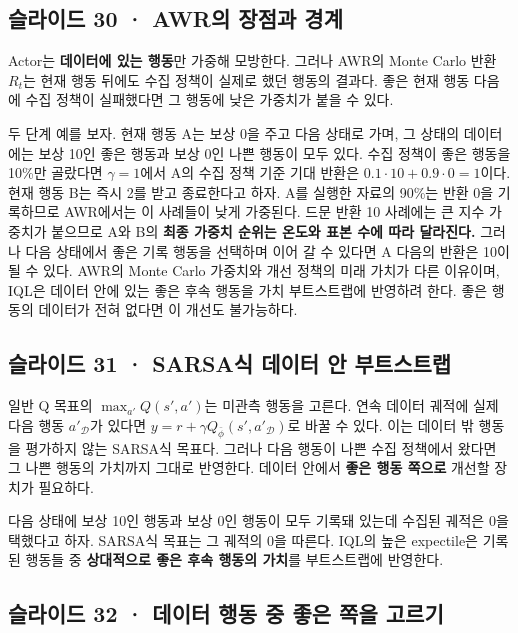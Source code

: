 \documentclass[11pt,a4paper]{article}
\begin{document}
\subsection{슬라이드 30 · AWR의 장점과 경계}

Actor는 \textbf{데이터에 있는 행동}만 가중해 모방한다. 그러나 AWR의 Monte Carlo 반환 $R_t$는 현재 행동 뒤에도 수집 정책이 실제로 했던 행동의 결과다. 좋은 현재 행동 다음에 수집 정책이 실패했다면 그 행동에 낮은 가중치가 붙을 수 있다.\par

두 단계 예를 보자. 현재 행동 A는 보상 0을 주고 다음 상태로 가며, 그 상태의 데이터에는 보상 10인 좋은 행동과 보상 0인 나쁜 행동이 모두 있다. 수집 정책이 좋은 행동을 10\%만 골랐다면 $\gamma=1$에서 A의 수집 정책 기준 기대 반환은 $0.1\cdot10+0.9\cdot0=1$이다. 현재 행동 B는 즉시 2를 받고 종료한다고 하자. A를 실행한 자료의 90\%는 반환 0을 기록하므로 AWR에서는 이 사례들이 낮게 가중된다. 드문 반환 10 사례에는 큰 지수 가중치가 붙으므로 A와 B의 \textbf{최종 가중치 순위는 온도와 표본 수에 따라 달라진다.} 그러나 다음 상태에서 좋은 기록 행동을 선택하며 이어 갈 수 있다면 A 다음의 반환은 10이 될 수 있다. AWR의 Monte Carlo 가중치와 개선 정책의 미래 가치가 다른 이유이며, IQL은 데이터 안에 있는 좋은 후속 행동을 가치 부트스트랩에 반영하려 한다. 좋은 행동의 데이터가 전혀 없다면 이 개선도 불가능하다.\par

\subsection{슬라이드 31 · SARSA식 데이터 안 부트스트랩}

일반 Q 목표의 $\max_{a'}Q(s',a')$는 미관측 행동을 고른다. 연속 데이터 궤적에 실제 다음 행동 $a'_{\mathcal D}$가 있다면 $y=r+\gamma Q_{\bar\phi}(s',a'_{\mathcal D})$로 바꿀 수 있다. 이는 데이터 밖 행동을 평가하지 않는 SARSA식 목표다. 그러나 다음 행동이 나쁜 수집 정책에서 왔다면 그 나쁜 행동의 가치까지 그대로 반영한다. 데이터 안에서 \textbf{좋은 행동 쪽으로} 개선할 장치가 필요하다.\par

다음 상태에 보상 10인 행동과 보상 0인 행동이 모두 기록돼 있는데 수집된 궤적은 0을 택했다고 하자. SARSA식 목표는 그 궤적의 0을 따른다. IQL의 높은 expectile은 기록된 행동들 중 \textbf{상대적으로 좋은 후속 행동의 가치}를 부트스트랩에 반영한다.\par

\subsection{슬라이드 32 · 데이터 행동 중 좋은 쪽을 고르기}
\end{document}
